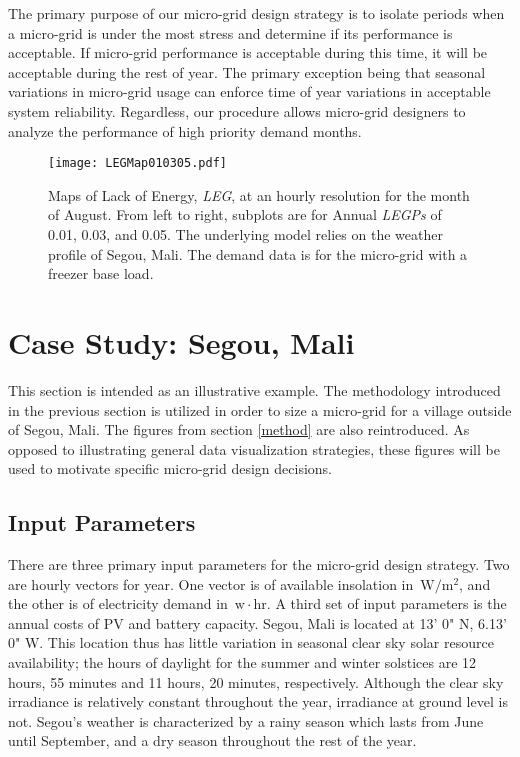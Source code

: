 \documentclass{article}
\newcommand{\unit}[1]{\ensuremath{\, \mathrm{#1}}}
\begin{document}

The primary purpose of our micro-grid design strategy is to isolate periods when a micro-grid is under the most stress and determine if its performance is acceptable.
If micro-grid performance is acceptable during this time, it will be acceptable during the rest of year.
The primary exception being that seasonal variations in micro-grid usage can enforce time of year variations in acceptable system reliability. 
Regardless, our procedure allows micro-grid designers to analyze the performance of high priority demand months. 



\begin{figure}[ht] 
  \centering
    \texttt{[image: LEGMap010305.pdf]}
  \caption{Maps of Lack of Energy, \emph{LEG}, at an hourly resolution for the month of August.
   From left to right, subplots are for Annual \emph{LEGPs} of 0.01, 0.03, and 0.05. 
  The underlying model relies on the weather profile of Segou, Mali.
  The demand data is for the micro-grid with a freezer base load.}
\label{LEGMaps}
\end{figure}


\section{Case Study: Segou, Mali} \label{CaseStudy}


This section is intended as an illustrative example.
The methodology introduced in the previous section is utilized in order to size a micro-grid for a village outside of Segou, Mali.
The figures from section \ref{method} are also reintroduced.
As opposed to illustrating general data visualization strategies, these figures will be used to motivate specific micro-grid design decisions.


\subsection{Input Parameters}


There are three primary input parameters for the micro-grid design strategy. 
Two are hourly vectors for year. One vector is of available insolation in \unit{W/m^2}, and the other is of electricity demand in \unit{w\! \cdot \! hr}.
A third set of input parameters is the annual costs of PV and battery capacity. 
%
%
Segou, Mali is located at 13' 0" N, 6.13' 0" W. 
This location thus has little variation in seasonal clear sky solar resource availability; the hours of daylight for the summer and winter solstices are 12 hours, 55 minutes and 11 hours, 20 minutes, respectively.  
Although the clear sky irradiance is relatively constant throughout the year, irradiance at ground level is not.
Segou's weather is characterized by a rainy season which lasts from June until September, and a dry season throughout the rest of the year. 
\end{document}
